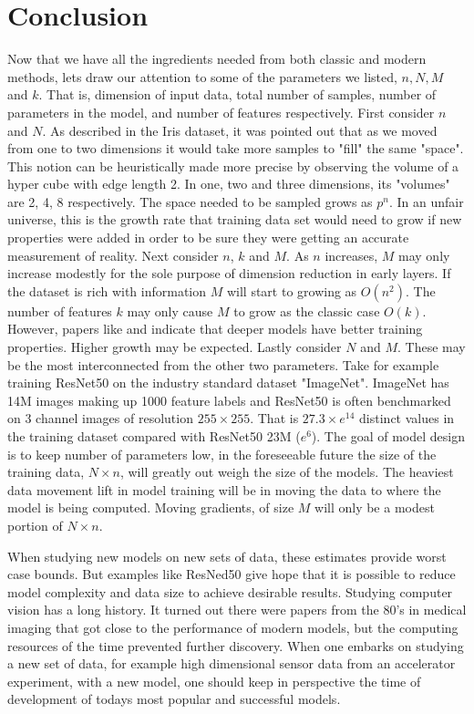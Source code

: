 \section{Conclusion}
Now that we have all the ingredients needed from both classic and modern methods, lets draw our attention to some of the parameters we listed, $n, N, M$ and $k$. That is, dimension of input data, total number of samples, number of parameters in the model, and number of features respectively. First consider $n$ and $N$. As described in the Iris dataset, it was pointed out that as we moved from one to two dimensions it would take more samples to "fill" the same "space". This notion can be heuristically made more precise by observing the volume of a hyper cube with edge length 2. In one, two and three dimensions, its "volumes" are 2, 4, 8 respectively. The space needed to be sampled grows as $p^n$. In an unfair universe, this is the growth rate that training data set would need to grow if new properties were added in order to be sure they were getting an accurate measurement of reality. Next consider $n$, $k$ and $M$. As $n$ increases, $M$ may only increase modestly for the sole purpose of dimension reduction in early layers. If the dataset is rich with information $M$ will start to growing as $O(n^2)$. The number of features $k$ may only cause $M$ to grow as the classic case $O(k)$. However, papers like \cite{nguyen2018on} and \cite{janocha2017loss} indicate that deeper models have better training properties. Higher growth may be expected. Lastly consider $N$ and $M$. These may be the most interconnected from the other two parameters. Take for example training ResNet50 on the industry standard dataset "ImageNet". ImageNet has 14M images making up 1000 feature labels and ResNet50 is often benchmarked on 3 channel images of resolution $255 \times 255$. That is $27.3\times e^{14}$ distinct values in the training dataset compared with ResNet50 23M ($e^6$). The goal of model design is to keep number of parameters low, in the foreseeable future the size of the training data, $N\times n$, will greatly out weigh the size of the models. The heaviest data movement lift in model training will be in moving the data to where the model is being computed. Moving gradients, of size $M$ will only be a modest portion of $N\times n$.

When studying new models on new sets of data, these estimates provide worst case bounds. But examples like ResNed50 give hope that it is possible to reduce model complexity and data size to achieve desirable results. Studying computer vision has a long history. It turned out there were papers from the 80's in medical imaging \cite{fukushima1982neocognitron} that got close to the performance of modern models, but the computing resources of the time prevented further discovery. When one embarks on studying a new set of data, for example high dimensional sensor data from an accelerator experiment, with a new model, one should keep in perspective the time of development of todays most popular and successful models.
